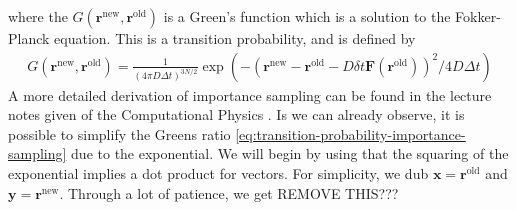 \documentclass[11pt]{article}
\newcommand{\husk}[1]{\color{red} #1 \color{black}}
\newcommand{\rn}{\mathbf{r}^\text{new}}
\newcommand{\ro}{\mathbf{r}^\text{old}}
\begin{document}
where the $G(\mathbf{r}^\text{new},\mathbf{r}^\text{old})$ is a Green's function which is a solution to the Fokker-Planck equation. This is a transition probability, and is defined by
\begin{align}
	G(\mathbf{r}^\text{new},\mathbf{r}^\text{old}) = \frac{1}{(4\pi D \Delta t)^{3N/2}}\exp \left(-(\rn - \ro - D\delta t \mathbf{F}(\ro))^2/4D\Delta t\right)
	\label{eq:greens-function}
\end{align}
A more detailed derivation of importance sampling can be found in the lecture notes given of the Computational Physics \cite{komp2015}. Is we can already observe, it is possible to simplify the Greens ratio \eqref{eq:transition-probability-importance-sampling} due to the exponential. We will begin by using that the squaring of the exponential implies a dot product for vectors. For simplicity, we dub $\mathbf{x} = \mathbf{r}^\text{old}$ and $\mathbf{y} = \mathbf{r}^\text{new}$. Through a lot of patience, we get \husk{REMOVE THIS???}
\end{document}

